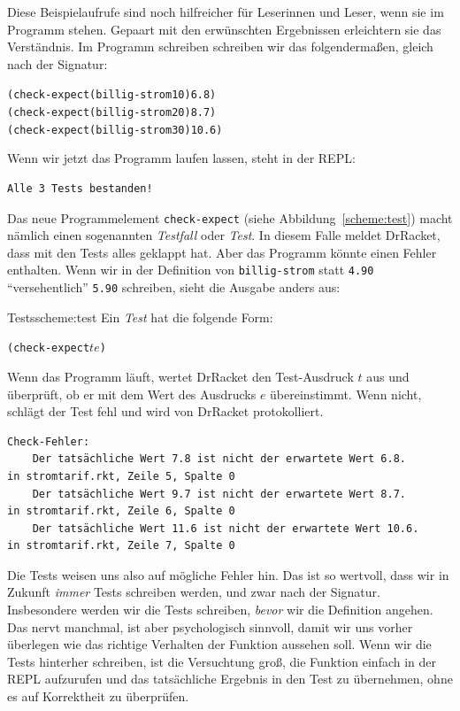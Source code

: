 Diese Beispielaufrufe sind noch hilfreicher für Leserinnen und Leser,
wenn sie im Programm stehen.  Gepaart mit den erwünschten Ergebnissen
erleichtern sie das Verständnis.  Im Programm schreiben schreiben wir
das folgendermaßen, gleich nach der Signatur:
%
\begin{alltt}
(check-expect (billig-strom 10) 6.8)
(check-expect (billig-strom 20) 8.7)
(check-expect (billig-strom 30) 10.6)
\end{alltt}
%
Wenn wir jetzt das Programm laufen lassen, steht in der REPL:
%
\begin{verbatim}
Alle 3 Tests bestanden!
\end{verbatim}
%
Das neue Programmelement
\texttt{check-expect} (siehe
Abbildung~\ref{scheme:test}) macht
nämlich einen sogenannten \textit{Testfall} oder \textit{Test}.  In diesem Falle
meldet DrRacket, dass mit den Tests alles geklappt hat.  Aber das
Programm könnte einen Fehler enthalten.  Wenn wir in der Definition
von \texttt{billig-strom} statt \texttt{4.90} "`versehentlich"'
\texttt{5.90} schreiben, sieht die Ausgabe anders aus:
%
\begin{feature}{Tests}{scheme:test}
  Ein \textit{Test} hat die folgende Form:
\begin{alltt}
(check-expect \(t\) \(e\))
\end{alltt}
%
Wenn das Programm läuft, wertet DrRacket den Test-Ausdruck $t$ aus und
überprüft, ob er mit dem Wert des Ausdrucks $e$ übereinstimmt.  Wenn
nicht, schlägt der Test fehl und wird von DrRacket protokolliert.
\end{feature}
%
\begin{verbatim}
Check-Fehler:
	Der tatsächliche Wert 7.8 ist nicht der erwartete Wert 6.8.
in stromtarif.rkt, Zeile 5, Spalte 0 
	Der tatsächliche Wert 9.7 ist nicht der erwartete Wert 8.7.
in stromtarif.rkt, Zeile 6, Spalte 0 
	Der tatsächliche Wert 11.6 ist nicht der erwartete Wert 10.6.
in stromtarif.rkt, Zeile 7, Spalte 0 
\end{verbatim}
%
Die Tests weisen uns also auf mögliche Fehler hin.  Das ist so
wertvoll, dass wir in Zukunft \emph{immer} Tests schreiben werden, und
zwar nach der Signatur.  Insbesondere werden wir die Tests schreiben,
\emph{bevor} wir die Definition angehen.  Das nervt manchmal, ist aber
psychologisch sinnvoll, damit wir uns vorher überlegen wie das
richtige Verhalten der Funktion aussehen soll.  Wenn wir die Tests
hinterher schreiben, ist die Versuchtung groß, die Funktion einfach in
der REPL aufzurufen und das tatsächliche Ergebnis in den Test zu
übernehmen, ohne es auf Korrektheit zu überprüfen.

